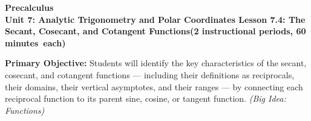 \documentclass[10pt]{article}
\newcommand{\CourseName}{Precalculus}
\newcommand{\MeetingLength}{60 minutes}
\newcommand{\UnitNumberName}{Unit 7: Analytic Trigonometry and Polar Coordinates \quad}
\newcommand{\LessonNumberName}{Lesson 7.4: The Secant, Cosecant, and Cotangent Functions}
\begin{document}
\begin{center}
  {\Large\bfseries \CourseName} \\[4pt]
  {\small\bfseries \UnitNumberName \LessonNumberName \quad (2 instructional periods, \MeetingLength\ each)}
\end{center}

\begin{tcolorbox}[colback=sky, colframe=navy, boxrule=0.9pt, arc=2mm,
    left=2mm, right=2mm, top=1.5mm, bottom=1.5mm]
  \textbf{Primary Objective:} Students will identify the key characteristics
  of the secant, cosecant, and cotangent functions --- including their definitions
  as reciprocals, their domains, their vertical asymptotes, and their ranges ---
  by connecting each reciprocal function to its parent sine, cosine, or tangent
  function.
  \textit{(Big Idea: Functions)}
\end{tcolorbox}

\vspace{0.08in}
\end{document}
